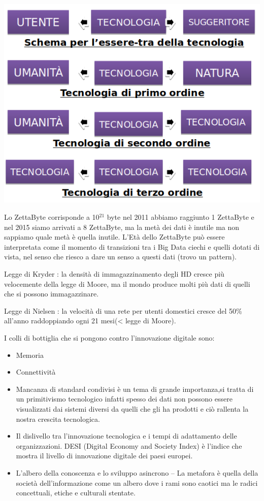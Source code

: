 \documentclass[a4page, 11pt]{article}
\begin{document}
\includegraphics[scale=0.6]{image2.png}

Lo ZettaByte corrisponde a 10$^{21}$ byte nel 2011 abbiamo raggiunto 1
ZettaByte e nel 2015 siamo arrivati a 8 ZettaByte, ma la metà dei dati è
inutile ma non sappiamo quale metà è quella inutile. L'Età dello
ZettaByte può essere interpretata come il momento di transizioni tra i
Big Data ciechi e quelli dotati di vista, nel senso che riesco a dare un
senso a questi dati (trovo un pattern).

Legge di Kryder : la densità di immagazzinamento degli HD cresce più
velocemente della legge di Moore, ma il mondo produce molti più dati di
quelli che si possono immagazzinare.

Legge di Nielsen : la velocità di una rete per utenti domestici cresce
del 50\% all'anno raddoppiando ogni 21 mesi(\textless{} legge di Moore).

I colli di bottiglia che si pongono contro l'innovazione digitale sono:

\begin{itemize}
	 
	\item
	Memoria
	\item
	Connettività
	\item
	Mancanza di standard condivisi è un tema di grande importanza,si 
	tratta di un primitivismo tecnologico infatti
	spesso dei dati non possono essere visualizzati dai sistemi diversi da
	quelli che gli ha prodotti e ciò rallenta la nostra crescita
	tecnologica. 
	\item
	Il dislivello tra l'innovazione tecnologica e i tempi di adattamento
	delle organizzazioni. DESI (Digital Economy and Society Index) è
	l'indice che mostra il livello di innovazione digitale dei paesi
	europei.
	\item
	L'albero della conoscenza e lo sviluppo asincrono -- La metafora è
	quella della società dell'informazione come un albero dove i rami sono
	caotici ma le radici concettuali, etiche e culturali stentate.
\end{itemize}
\end{document}
